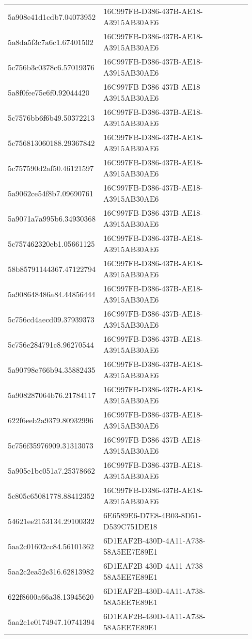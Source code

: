 \begin{tabular}{ll}
5a908e41d1cdb7.04073952 & 16C997FB-D386-437B-AE18-A3915AB30AE6 \\
5a8da5f3c7a6c1.67401502 & 16C997FB-D386-437B-AE18-A3915AB30AE6 \\
5c756b3c0378c6.57019376 & 16C997FB-D386-437B-AE18-A3915AB30AE6 \\
5a8f0fee75e6f0.92044420 & 16C997FB-D386-437B-AE18-A3915AB30AE6 \\
5c7576bb6f6b49.50372213 & 16C997FB-D386-437B-AE18-A3915AB30AE6 \\
5c756813060188.29367842 & 16C997FB-D386-437B-AE18-A3915AB30AE6 \\
5c757590d2af50.46121597 & 16C997FB-D386-437B-AE18-A3915AB30AE6 \\
5a9062ce54f8b7.09690761 & 16C997FB-D386-437B-AE18-A3915AB30AE6 \\
5a9071a7a995b6.34930368 & 16C997FB-D386-437B-AE18-A3915AB30AE6 \\
5c757462320eb1.05661125 & 16C997FB-D386-437B-AE18-A3915AB30AE6 \\
58b85791144367.47122794 & 16C997FB-D386-437B-AE18-A3915AB30AE6 \\
5a908648486a84.44856444 & 16C997FB-D386-437B-AE18-A3915AB30AE6 \\
5c756cd4aecd09.37939373 & 16C997FB-D386-437B-AE18-A3915AB30AE6 \\
5c756e284791c8.96270544 & 16C997FB-D386-437B-AE18-A3915AB30AE6 \\
5a90798e766b94.35882435 & 16C997FB-D386-437B-AE18-A3915AB30AE6 \\
5a908287064b76.21784117 & 16C997FB-D386-437B-AE18-A3915AB30AE6 \\
622f6eeb2a9379.80932996 & 16C997FB-D386-437B-AE18-A3915AB30AE6 \\
5c756f35976909.31313073 & 16C997FB-D386-437B-AE18-A3915AB30AE6 \\
5a905e1bc051a7.25378662 & 16C997FB-D386-437B-AE18-A3915AB30AE6 \\
5c805c65081778.88412352 & 16C997FB-D386-437B-AE18-A3915AB30AE6 \\
54621ee2153134.29100332 & 6E6589E6-D7E8-4B03-8D51-D539C751DE18 \\
5aa2c01602cc84.56101362 & 6D1EAF2B-430D-4A11-A738-58A5EE7E89E1 \\
5aa2c2ea52e316.62813982 & 6D1EAF2B-430D-4A11-A738-58A5EE7E89E1 \\
622f8600a66a38.13945620 & 6D1EAF2B-430D-4A11-A738-58A5EE7E89E1 \\
5aa2c1e0174947.10741394 & 6D1EAF2B-430D-4A11-A738-58A5EE7E89E1 \\

\end{tabular}
